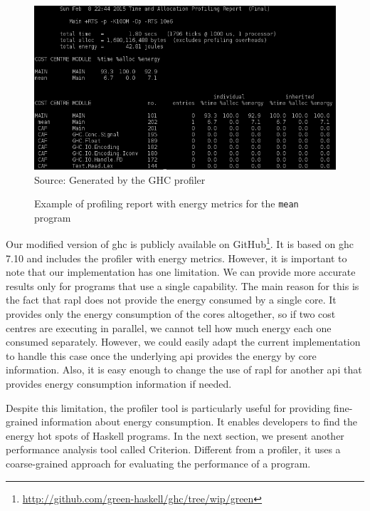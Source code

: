 \begin{figure}[htp]
  \centering
  \caption{Example of profiling report with energy metrics for the \texttt{mean} program}
  \includegraphics[width=\columnwidth]{images/energy-profiler-placeholder}
  \footnotesize{Source: Generated by the GHC profiler}
  \label{fig:energy-prof-report}
\end{figure}

Our modified version of \ac{ghc} is publicly available on GitHub\footnote{\url{http://github.com/green-haskell/ghc/tree/wip/green}}. It is based on \ac{ghc} 7.10 and includes the profiler with energy metrics. However, it is important to note that our implementation has one limitation. We can provide more accurate results only for programs that use a single capability. The main reason for this is the fact that \ac{rapl} does not provide the energy consumed by a single core. It provides only the energy consumption of the cores altogether, so if two cost centres are executing in parallel, we cannot tell how much energy each one consumed separately. However, we could easily adapt the current implementation to handle this case once the underlying \ac{api} provides the energy by core information. Also, it is easy enough to change the use of \ac{rapl} for another \ac{api} that provides energy consumption information if needed.

Despite this limitation, the profiler tool is particularly useful for providing fine-grained information about energy consumption. It enables developers to find the energy hot spots of Haskell programs. In the next section, we present another performance analysis tool called Criterion. Different from a profiler, it uses a coarse-grained approach for evaluating the performance of a program.


